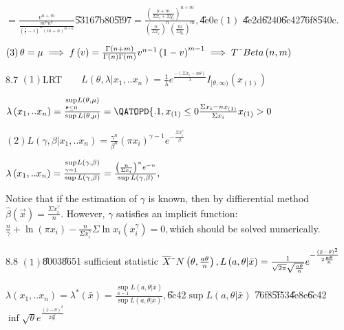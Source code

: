 \documentclass{article}
\begin{document}
$=\frac{v^{n+m}}{\frac{m^{m}n^{n}}{\left( \frac{1}{v}-1\right) ^{m}\left(
m+n\right) ^{m+n}}}$\U{5316}\U{7b80}\U{5f97}$=\frac{\left( \frac{n+m}{\Sigma
x_{i}+\Sigma y_{i}}\right) ^{n+m}}{\left( \frac{n}{\Sigma x_{i}}\right)
^{n}\left( \frac{m}{\Sigma y_{i}}\right) ^{m}},$\U{4e0e}$\left( 1\right) $%
\U{4e2d}\U{6240}\U{6c42}\U{76f8}\U{540c}$.$

$\left( 3\right) \theta =\mu \implies f\left( v\right) =\frac{\Gamma \left(
n+m\right) }{\Gamma \left( n\right) \Gamma \left( m\right) }v^{n-1}\left(
1-v\right) ^{m-1}\implies T\symbol{126}Beta\left( n,m\right) $

8.7 $\left( 1\right) $LRT$\qquad L\left( \theta ,\lambda
|x_{1},..x_{n}\right) =\frac{1}{\lambda }e^{\frac{-\left( \Sigma
x_{i}-n\theta \right) }{\lambda }}I_{[\theta ,\infty )}\left( x_{\left(
1\right) }\right) $

$\lambda \left( x_{1},..x_{n}\right) =\frac{\underset{\theta \leq 0}{\sup }%
L\left( \theta ,\mu \right) }{\sup L\left( \theta ,\mu \right) }=\QATOPD\{ .
{1,x_{\left( 1\right) }\leq 0}{\frac{\Sigma x_{i}-nx_{\left( 1\right) }}{%
\Sigma x_{i}}x_{\left( 1\right) }>0}$

$\left( 2\right) L\left( \gamma ,\beta |x_{1},..x_{n}\right) =\frac{\gamma
^{n}}{\beta ^{n}}\left( \pi x_{i}\right) ^{\gamma -1}e^{-\frac{\Sigma
x_{i}^{\gamma }}{\beta }}$

$\lambda \left( x_{1},..x_{n}\right) =\frac{\underset{\gamma =1}{\sup }%
L\left( \gamma ,\beta \right) }{\sup L\left( \gamma ,\beta \right) }=\frac{%
\left( \frac{n}{\Sigma x_{i}}\right) ^{n}e^{-n}}{\sup L\left( \gamma ,\beta
\right) },$

Notice that if the estimation of $\gamma $ is known, then by diffierential
method $\hat{\beta}\left( \vec{x}\right) =\frac{\Sigma x_{i}^{\gamma }}{n}.$%
However, $\gamma $ satisfies an implicit function: $\frac{n}{\gamma }+\ln
\left( \pi x_{i}\right) -\frac{n}{\Sigma x_{i}^{\gamma }}\Sigma \ln
x_{i}\left( x_{i}^{\gamma }\right) =0,$which should be solved numerically.

8.8 $\left( 1\right) $\U{8003}\U{8651} sufficient statistic $\overline{X}%
\symbol{126}N\left( \theta ,\frac{a\theta }{n}\right) ,L\left( a,\theta |%
\bar{x}\right) =\frac{1}{\sqrt{2\pi }\sqrt{\frac{a\theta }{n}}}e^{-\frac{%
\left( \bar{x}-\theta \right) ^{2}}{2\frac{a\theta }{n}}}$

$\lambda \left( x_{1},..x_{n}\right) =\lambda ^{\ast }\left( \bar{x}\right) =%
\frac{\underset{a=1}{\sup }L\left( a,\theta |\bar{x}\right) }{\sup L\left(
a,\theta |\bar{x}\right) },$\U{6c42}$\sup L\left( a,\theta |\bar{x}\right) $%
\U{76f8}\U{5f53}\U{4e8e}\U{6c42}$\inf \sqrt{\theta }e^{\frac{\left( \bar{x}%
-\theta \right) ^{2}}{2\frac{a\theta }{n}}}$
\end{document}
